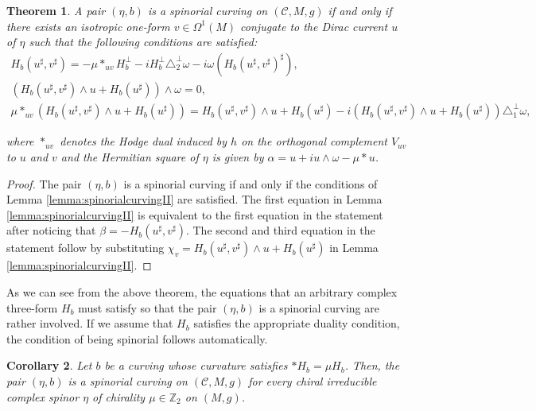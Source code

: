 \documentclass[10pt,a4paper,twoside,reqno]{amsart}
\theoremstyle{plain}
\newtheorem{thm}{Theorem}[section]
\newtheorem{cor}[thm]{Corollary}
\theoremstyle{definition}
\theoremstyle{remark}
\def\cC{{\mathcal C}}
\def\cC{\mathcal{C}}
\begin{document}
\begin{thm}
\label{thm:spinorialcurving}
A pair $(\eta,b)$ is a spinorial curving on $(\cC,M,g)$ if and only if there exists an isotropic one-form $v\in \Omega^1(M)$ conjugate to the Dirac current $u$ of $\eta$ such that the following conditions are satisfied:
\begin{gather*}
H_b(u^{\sharp},v^{\sharp}) = -\mu \ast_{uv} H_b^\perp - iH_b^\perp\triangle_2^\perp\omega - i\omega(H_b(u^{\sharp},v^{\sharp})^\sharp),\\
(H_b(u^\sharp,v^\sharp)\wedge u+H_b(u^\sharp))\wedge\omega=0,\\
\mu \ast_{uv} (H_b(u^\sharp,v^\sharp)\wedge u+H_b(u^\sharp)) = H_b(u^\sharp,v^\sharp)\wedge u+H_b(u^\sharp) - i (H_b(u^\sharp,v^\sharp)\wedge u+H_b(u^\sharp)) \triangle^{\perp}_1 \omega,
\end{gather*}

\noindent
where $\ast_{uv}$ denotes the Hodge dual induced by $h$ on the orthogonal complement $V_{uv}$ to $u$ and $v$ and the Hermitian square of $\eta$ is given by $\widehat{\alpha} = u + i u\wedge \omega - \mu \ast u$. 
\end{thm}
  
\begin{proof}
The pair $(\eta , b)$ is a spinorial curving if and only if the conditions of Lemma \ref{lemma:spinorialcurvingII} are satisfied. The first equation in Lemma \ref{lemma:spinorialcurvingII} is equivalent to the first equation in the statement after noticing that $\beta = -H_b(u^{\sharp},v^{\sharp})$. The second and third equation in the statement follow by substituting $\chi_v=H_b(u^\sharp,v^\sharp)\wedge u+H_b(u^\sharp)$ in Lemma \ref{lemma:spinorialcurvingII}.
\end{proof}

\noindent
As we can see from the above theorem, the equations that an arbitrary complex three-form $H_b$ must satisfy so that the pair $(\eta,b)$ is a spinorial curving are rather involved. If we assume that $H_b$ satisfies the appropriate duality condition, the condition of being spinorial follows automatically.

\begin{cor}\label{cor:b_curving_if_H_dual}
Let $b$ be a curving whose curvature satisfies $\ast H_b = \mu H_b$. Then, the pair $(\eta,b)$ is a spinorial curving on $(\cC,M,g)$ for every chiral irreducible complex spinor $\eta$ of chirality $\mu\in \mathbb{Z}_2$ on $(M,g)$.
\end{cor}
\end{document}
